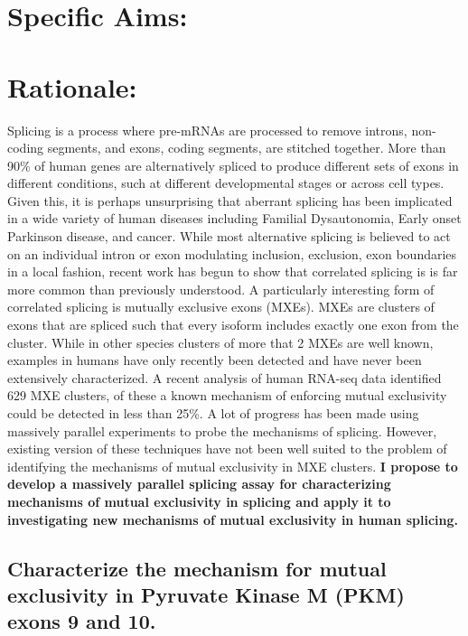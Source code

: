 \documentclass{article}
\begin{document}
\section*{Specific Aims:}
%
\section*{Rationale: } 
Splicing is a process where pre-mRNAs are processed to remove introns, non-coding segments, and exons, coding segments, are stitched together. 
More than 90\% of human genes are alternatively spliced to produce different sets of exons in different conditions, such at different developmental stages or across cell types.\cite{Wang2008-ej} 
Given this, it is perhaps unsurprising that aberrant splicing has been implicated in a wide variety of human diseases including Familial Dysautonomia, Early onset Parkinson disease, and cancer.\cite{Scotti2015-yp} 
While most alternative splicing is believed to act on an individual intron or exon modulating inclusion, exclusion, exon boundaries in a local fashion, recent work has begun to show that correlated splicing is is far more common than previously understood.\cite{Zhu2021-fs, Tilgner2015-sb, Hatje2017-oj} 
A particularly interesting form of correlated splicing is mutually exclusive exons (MXEs). 
MXEs are clusters of exons that are spliced such that every isoform includes exactly one exon from the cluster. 
While in other species clusters of more that 2 MXEs are well known, examples in humans have only recently been detected and have never been extensively characterized.\cite{Jin2018-tq, Hatje2017-oj} 
A recent analysis of human RNA-seq data identified 629 MXE clusters, of these a known mechanism of enforcing mutual exclusivity could be detected in less than 25\%.\cite{Hatje2017-oj} 
A lot of progress has been made using massively parallel experiments to probe the mechanisms of splicing.\cite{Ke2018-af, Julien2016-wa, Adamson2018-va, Soemedi2017-pz, Cortes-Lopez2022-gy, Schirman2021-ss, Mikl2019-ng, Braun2018-mb, Soucek2019-iq, Baeza-Centurion2020-tn, Cheung2019-ah, Baeza-Centurion2019-hz, Rosenberg2015-zs, Wong2018-vq} 
However, existing version of these techniques have not been well suited to the problem of identifying the mechanisms of mutual exclusivity in MXE clusters. 
\textbf{I propose to develop a massively parallel splicing assay for characterizing mechanisms of mutual exclusivity in splicing and apply it to investigating new mechanisms of mutual exclusivity in human splicing.}
%
\subsection{Characterize the mechanism for mutual exclusivity in Pyruvate Kinase M (PKM) exons 9 and 10.}
%
\end{document}
